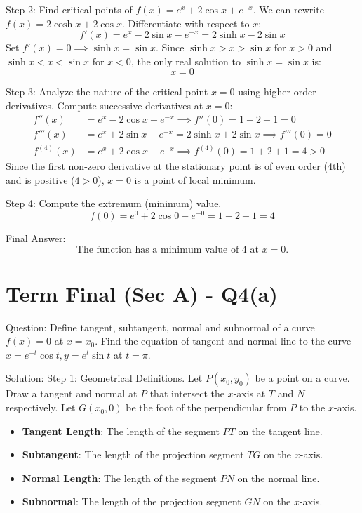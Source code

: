 \documentclass{article}
\begin{document}
Step 2: Find critical points of $f(x) = e^x + 2\cos x + e^{-x}$.
We can rewrite $f(x) = 2\cosh x + 2\cos x$.
Differentiate with respect to $x$:
\[
f'(x) = e^x - 2\sin x - e^{-x} = 2\sinh x - 2\sin x
\]
Set $f'(x) = 0 \implies \sinh x = \sin x$.
Since $\sinh x > x > \sin x$ for $x > 0$ and $\sinh x < x < \sin x$ for $x < 0$, the only real solution to $\sinh x = \sin x$ is:
\[
x = 0
\]

Step 3: Analyze the nature of the critical point $x = 0$ using higher-order derivatives.
Compute successive derivatives at $x = 0$:
\begin{align*}
    f''(x) &= e^x - 2\cos x + e^{-x} \implies f''(0) = 1 - 2 + 1 = 0 \\
    f'''(x) &= e^x + 2\sin x - e^{-x} = 2\sinh x + 2\sin x \implies f'''(0) = 0 \\
    f^{(4)}(x) &= e^x + 2\cos x + e^{-x} \implies f^{(4)}(0) = 1 + 2 + 1 = 4 > 0
\end{align*}
Since the first non-zero derivative at the stationary point is of even order (4th) and is positive ($4 > 0$), $x = 0$ is a point of local minimum.

Step 4: Compute the extremum (minimum) value.
\[
f(0) = e^0 + 2\cos 0 + e^{-0} = 1 + 2 + 1 = 4
\]

Final Answer:
\[
\boxed{\text{The function has a minimum value of } 4 \text{ at } x = 0.}
\]

\section*{Term Final (Sec A) - Q4(a)}
Question:
Define tangent, subtangent, normal and subnormal of a curve $f(x)=0$ at $x=x_0$. Find the equation of tangent and normal line to the curve $x=e^{-t}\cos t, y=e^t\sin t$ at $t=\pi$.

Solution:
Step 1: Geometrical Definitions.
Let $P(x_0, y_0)$ be a point on a curve. Draw a tangent and normal at $P$ that intersect the $x$-axis at $T$ and $N$ respectively. Let $G(x_0, 0)$ be the foot of the perpendicular from $P$ to the $x$-axis.
\begin{itemize}
    \item \textbf{Tangent Length}: The length of the segment $PT$ on the tangent line.
    \item \textbf{Subtangent}: The length of the projection segment $TG$ on the $x$-axis.
    \item \textbf{Normal Length}: The length of the segment $PN$ on the normal line.
    \item \textbf{Subnormal}: The length of the projection segment $GN$ on the $x$-axis.
\end{itemize}
\end{document}
